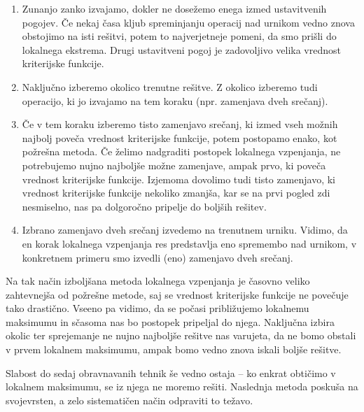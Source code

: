\documentclass[10pt, a4paper]{article}
\begin{document}
\begin{enumerate}
   \item Zunanjo zanko izvajamo, dokler ne dosežemo enega izmed ustavitvenih pogojev.
   Če nekaj časa kljub spreminjanju operacij nad urnikom vedno znova obstojimo na isti
   rešitvi, potem to najverjetneje pomeni, da smo prišli do lokalnega ekstrema. Drugi
   ustavitveni pogoj je zadovoljivo velika vrednost kriterijske funkcije.

   \item Naključno izberemo okolico trenutne rešitve. Z okolico izberemo tudi operacijo,
   ki jo izvajamo na tem koraku (npr. zamenjava dveh srečanj).

   \item Če v tem koraku izberemo tisto zamenjavo srečanj, ki izmed vseh možnih najbolj
   poveča vrednost kriterijske funkcije, potem postopamo enako, kot požrešna metoda. Če
   želimo nadgraditi postopek lokalnega vzpenjanja, ne potrebujemo nujno najboljše možne
   zamenjave, ampak prvo, ki poveča vrednost kriterijske funkcije. Izjemoma dovolimo tudi
   tisto zamenjavo, ki vrednost kriterijske funkcije nekoliko zmanjša, kar se na prvi
   pogled zdi nesmiselno, nas pa dolgoročno pripelje do boljših rešitev.

   \item Izbrano zamenjavo dveh srečanj izvedemo na trenutnem urniku. Vidimo, da en korak
   lokalnega vzpenjanja res predstavlja eno spremembo nad urnikom, v konkretnem primeru
   smo izvedli (eno) zamenjavo dveh srečanj.
\end{enumerate}

\noindent Na tak način izboljšana metoda lokalnega vzpenjanja je časovno veliko zahtevnejša od
požrešne metode, saj se vrednost kriterijske funkcije ne povečuje tako drastično. Vseeno
pa vidimo, da se počasi približujemo lokalnemu maksimumu in sčasoma nas bo postopek
pripeljal do njega. Naključna izbira okolic ter sprejemanje ne nujno najboljše rešitve
nas varujeta, da ne bomo obstali v prvem lokalnem maksimumu, ampak bomo vedno znova
iskali boljše rešitve.

Slabost do sedaj obravnavanih tehnik še vedno ostaja -- ko enkrat obtičimo v lokalnem
maksimumu, se iz njega ne moremo rešiti. Naslednja metoda poskuša na svojevrsten, a zelo
sistematičen način odpraviti to težavo.
\end{document}
